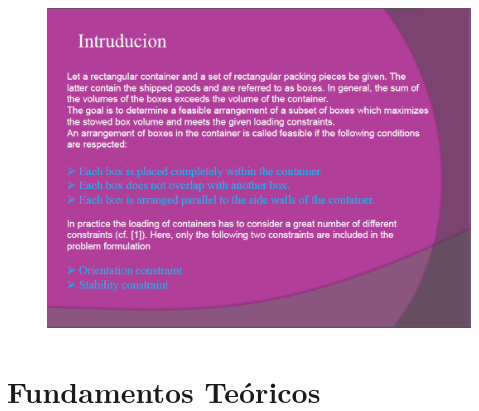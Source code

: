 \documentclass{beamer}
\begin{document}
\begin{frame}
\frametitle{ }
\begin{figure}[!th]
\begin{center}
\includegraphics[width=1\textwidth]{img/picn2.eps}
\end{center}
\end{figure}
\end{frame}


\section{Fundamentos Teóricos}
\end{document}

